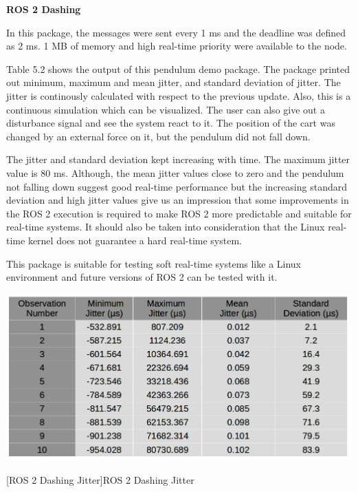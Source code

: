 \documentclass[%
xelatex,
	oneside,		%
	12pt,			%
	parskip=half,	%
	abstracton,
	chapterprefix=true%
    appendixprefix=true]
{scrbook}
\begin{document}
{\bfseries ROS 2 Dashing}
\vspace*{0.25cm}

In this package, the messages were sent every 1 ms and the deadline was defined as 2 ms. 1 MB of memory and high real-time priority were available to the node.  

\vspace*{0.2cm}
Table 5.2 shows the output of this pendulum demo package. The package printed out minimum, maximum and mean jitter, and standard deviation of jitter. The jitter is continously calculated with respect to the previous update. Also, this is a continuous simulation which can be visualized. The user can also give out a disturbance signal and see the system react to it. The position of the cart was changed by an external force on it, but the pendulum did not fall down.

\vspace*{0.2cm}
The jitter and standard deviation kept increasing with time. The maximum jitter value is 80 ms.
Although, the mean jitter values close to zero and the pendulum not falling down suggest good real-time performance but the increasing standard deviation and high jitter values give us an impression that some improvements in the ROS 2 execution is required to make ROS 2 more predictable and suitable for real-time systems. It should also be taken into consideration that the Linux real-time kernel does not guarantee a hard real-time system.

\vspace*{0.2cm}
This package is suitable for testing soft real-time systems like a Linux environment and future versions of ROS 2 can be tested with it.
\begin{center}
\includegraphics[scale=0.4]{fig/ros2dashjitter.png}

[ROS 2 Dashing Jitter]{ROS 2 Dashing Jitter}
\label{tab:ros2dashjit}
\end{center}
\end{document}

